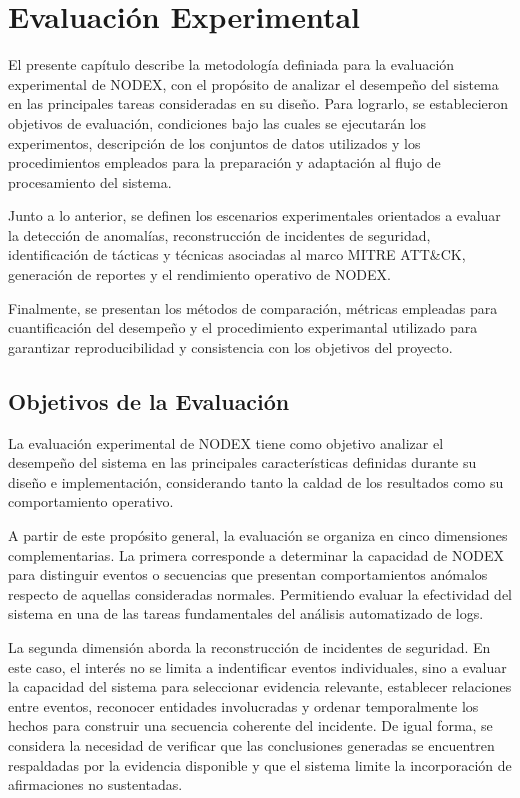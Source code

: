 \chapter{Evaluación Experimental}

El presente capítulo describe la metodología definiada para la evaluación experimental de NODEX, con el propósito de analizar el desempeño del sistema en las principales tareas consideradas en su diseño. Para lograrlo, se establecieron objetivos de evaluación, condiciones bajo las cuales se ejecutarán los experimentos, descripción de los conjuntos de datos utilizados y los procedimientos empleados para la preparación y adaptación al flujo de procesamiento del sistema.

Junto a lo anterior, se definen los escenarios experimentales orientados a evaluar la detección de anomalías, reconstrucción de incidentes de seguridad, identificación de tácticas y técnicas asociadas al marco MITRE ATT\&CK, generación de reportes y el rendimiento operativo de NODEX.

Finalmente, se presentan los métodos de comparación, métricas empleadas para cuantificación del desempeño y el procedimiento experimantal utilizado para garantizar reproducibilidad y consistencia con los objetivos del proyecto.

\section{Objetivos de la Evaluación}

La evaluación experimental de NODEX tiene como objetivo analizar el desempeño del sistema en las principales características definidas durante su diseño e implementación, considerando tanto la caldad de los resultados como su comportamiento operativo.

A partir de este propósito general, la evaluación se organiza en cinco dimensiones complementarias. La primera corresponde a determinar la capacidad de NODEX para distinguir eventos o secuencias que presentan comportamientos anómalos respecto de aquellas consideradas normales. Permitiendo evaluar la efectividad del sistema en una de las tareas fundamentales del análisis automatizado de logs.

La segunda dimensión aborda la reconstrucción de incidentes de seguridad. En este caso, el interés no se limita a indentificar eventos individuales, sino a evaluar la capacidad del sistema para seleccionar evidencia relevante, establecer relaciones entre eventos, reconocer entidades involucradas y ordenar temporalmente los hechos para construir una secuencia coherente del incidente. De igual forma, se considera la necesidad de verificar que las conclusiones generadas se encuentren respaldadas por la evidencia disponible y que el sistema limite la incorporación de afirmaciones no sustentadas.

